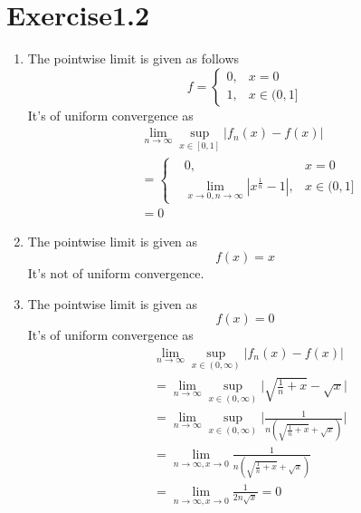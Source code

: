 \documentclass[paper=a4, fontsize=11pt]{scrartcl} %
\numberwithin{equation}{section} %
\numberwithin{figure}{section} %
\numberwithin{table}{section} %
\begin{document}
\section{Exercise1.2}
\begin{enumerate}
	\item
		The pointwise limit is given as follows
		\begin{equation}
			f = \left\{\begin{aligned}
			0, & x = 0\\
			1, & x\in(0,1]
			\end{aligned}
			\right.
		\end{equation}
		It's of uniform convergence as
		\begin{equation}
			\begin{aligned}
				&  \lim\limits_{n\rightarrow\infty} \sup_{x\in[0, 1]} |f_n(x) - f(x)|\\
				&=\left\{
					\begin{aligned}
						&0,  &x=0\\ 
						&\lim\limits_{x\rightarrow 0,  n \rightarrow \infty} |x^{\frac{1}{n}} - 1|, & x \in (0, 1]
					\end{aligned}
					\right.\\
				&=0
			\end{aligned}
		\end{equation}
	\item 
		The pointwise limit is given as
		\begin{equation}
			f(x) = x
		\end{equation}
		It's not of uniform convergence.
	\item 
		The pointwise limit is given as
		\begin{equation}
			f(x) = 0
		\end{equation}
		It's of uniform convergence as
		\begin{equation}
			\begin{aligned}
				&	\lim\limits_{n\rightarrow\infty}\sup_{x\in(0, \infty)}|f_n(x) - f(x)|\\
				& =\lim\limits_{n\rightarrow\infty}\sup_{x\in(0, \infty)}\Biggl|\sqrt{\frac{1}{n} + x} - \sqrt{x}\Biggr|\\
				& =\lim\limits_{n\rightarrow\infty}\sup_{x\in(0, \infty)}\Biggl|\frac{1}{n(\sqrt{\frac{1}{n} + x} + \sqrt{x})}\Biggr|\\
				& = \lim\limits_{n\rightarrow\infty, x \rightarrow 0}\frac{1}{n(\sqrt{\frac{1}{n} + x} + \sqrt{x})}\\
				& = \lim\limits_{n\rightarrow\infty, x \rightarrow 0}\frac{1}{2n\sqrt{x}} = 0
			\end{aligned}
		\end{equation}
\end{enumerate}
\end{document}
